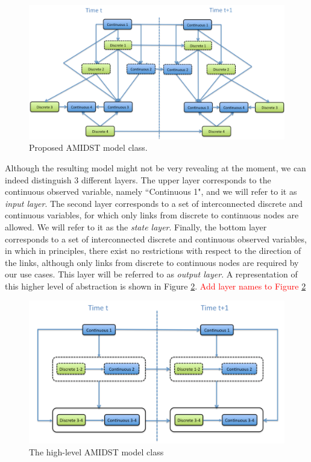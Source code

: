 \begin{figure}[ht!]
\begin{center}
\includegraphics[scale=0.39]{./figures/AMIDSTModelClass}
\caption{\label{Figure:AMIDSTModelClass} Proposed AMIDST model class.}
\end{center}
\end{figure}


Although the resulting model might not be very revealing at the moment, we can indeed distinguish 3 different layers. The upper layer corresponds to the continuous observed variable, namely ``Continuous 1", and we will refer to it as \textit{input layer}. The second layer corresponds to a set of interconnected discrete and continuous variables, for which only links from discrete to continuous nodes are allowed. We will refer to it as the \textit{state layer}. Finally, the bottom layer corresponds to a set of interconnected discrete and continuous observed variables, in which in principles, there exist no restrictions with respect to the direction of the links, although only links from discrete to continuous nodes are required by our use cases. This layer will be referred to as \textit{output layer}. A representation of this higher level of abstraction is shown in Figure \ref{Figure:AMIDSTModelClassHighLevel}. \textcolor{red}{Add layer names to Figure \ref{Figure:AMIDSTModelClassHighLevel}}

\begin{figure}[ht!]
\begin{center}
\includegraphics[scale=0.4]{./figures/AMIDSTModelClassGeneral}
\caption{\label{Figure:AMIDSTModelClassHighLevel} The high-level AMIDST model class}
\end{center}
\end{figure}

